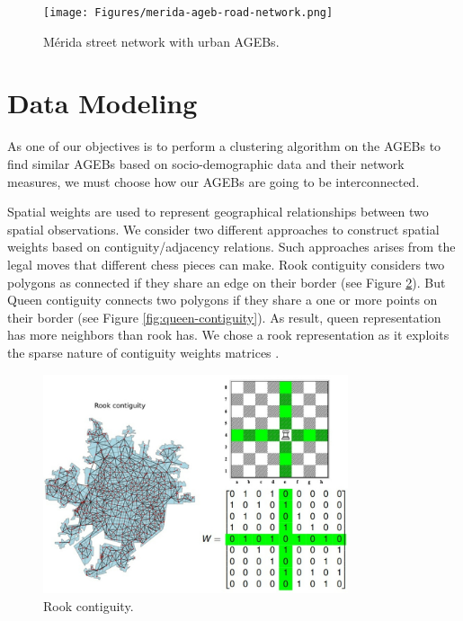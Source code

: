 \begin{figure}[htpb]
  \centering
 \texttt{[image: Figures/merida-ageb-road-network.png]}
  \caption{Mérida street network with urban AGEBs.
    \label{fig:merida-ageb-street-network}}
\end{figure}

\section{Data Modeling}

As one of our objectives is to perform a clustering algorithm on the AGEBs to find similar AGEBs based on socio-demographic data and their network measures, we must choose how our AGEBs are going to be interconnected.

Spatial weights are used to represent geographical relationships between two spatial observations. We consider two different approaches to construct spatial weights based on contiguity/adjacency relations. Such approaches arises from the legal moves that different chess pieces can make. Rook contiguity considers two polygons as connected if they share an edge on their border (see Figure \ref{fig:rook-contiguity}). But Queen contiguity connects two polygons if they share a one or more points on their border (see Figure \ref{fig:queen-contiguity}). As result, queen representation has more neighbors than rook has. We chose a rook representation as it exploits the sparse nature of contiguity weights matrices \cite{rey_geo_ds_2020}.

\begin{figure}[htpb]
  \centering
  \includegraphics[width=0.8\textwidth]{Figures/rook-contiguity.jpg}
  \caption{Rook contiguity.
    \label{fig:rook-contiguity}}
\end{figure}

